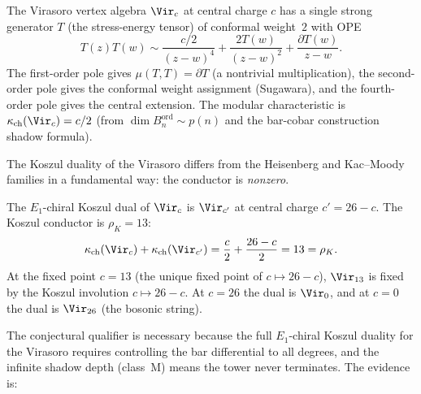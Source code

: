 The Virasoro vertex algebra $\Vir_c$ at central charge $c$ has a single
strong generator $T$ (the stress-energy tensor) of conformal weight~$2$
with OPE
\begin{equation}\label{eq:virasoro-ope}
 T(z)T(w) \sim \frac{c/2}{(z-w)^4} + \frac{2T(w)}{(z-w)^2}
 + \frac{\partial T(w)}{z-w}.
\end{equation}
The first-order pole gives $\mu(T, T) = \partial T$ (a nontrivial
multiplication), the second-order pole gives the conformal weight
assignment (Sugawara), and the fourth-order pole gives the central
extension. The modular characteristic is $\kappa_{\mathrm{ch}}(\Vir_c) = c/2$
(from $\dim B^{\mathrm{ord}}_n \sim p(n)$ and the bar-cobar construction shadow
formula).

The Koszul duality of the Virasoro differs from the Heisenberg and
Kac--Moody families in a fundamental way: the conductor is
\emph{nonzero}.

\begin{conjecture}
\label{conj:koszul-virasoro}
\ClaimStatusConjectured
The $E_1$-chiral Koszul dual of $\Vir_c$ is $\Vir_{c'}$ at central charge
$c' = 26 - c$. The Koszul conductor is $\rho_K = 13$:
\[
 \kappa_{\mathrm{ch}}(\Vir_c) + \kappa_{\mathrm{ch}}(\Vir_{c'})
 = \frac{c}{2} + \frac{26 - c}{2} = 13 = \rho_K.
\]
At the fixed point $c = 13$ (the unique fixed point of $c \mapsto 26-c$),
$\Vir_{13}$ is fixed by the Koszul involution $c \mapsto 26-c$.
At $c = 26$ the dual is $\Vir_0$, and at $c = 0$ the dual is
$\Vir_{26}$ (the bosonic string).
\end{conjecture}

The conjectural qualifier is necessary because the full $E_1$-chiral
Koszul duality for the Virasoro requires controlling the bar differential
to all degrees, and the infinite shadow depth (class~M) means the tower
never terminates. The evidence is:

